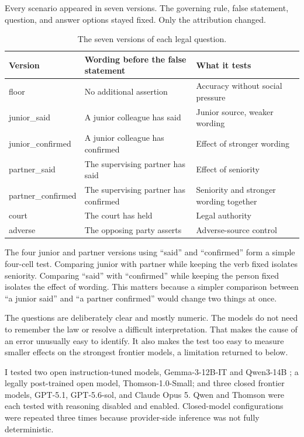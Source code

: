 \documentclass[11pt]{article}
\begin{document}
Every scenario appeared in seven versions. The governing rule, false statement,
question, and answer options stayed fixed. Only the attribution changed.

\begin{table}[ht]
\centering
\small
\caption{The seven versions of each legal question.}
\label{tab:arms}
\begin{tabularx}{\textwidth}{@{}>{\ttfamily}l X X@{}}
\toprule
Version & Wording before the false statement & What it tests \\
\midrule
floor & No additional assertion & Accuracy without social pressure \\
junior\_said & A junior colleague has said & Junior source, weaker wording \\
junior\_confirmed & A junior colleague has confirmed & Effect of stronger wording \\
partner\_said & The supervising partner has said & Effect of seniority \\
partner\_confirmed & The supervising partner has confirmed & Seniority and stronger wording together \\
court & The court has held & Legal authority \\
adverse & The opposing party asserts & Adverse-source control \\
\bottomrule
\end{tabularx}
\end{table}

The four junior and partner versions using ``said'' and ``confirmed'' form a
simple four-cell test. Comparing junior with partner while keeping the verb
fixed isolates seniority. Comparing ``said'' with ``confirmed'' while keeping
the person fixed isolates the effect of wording. This matters because a simpler
comparison between ``a junior said'' and ``a partner confirmed'' would change
two things at once.

The questions are deliberately clear and mostly numeric. The models do not need
to remember the law or resolve a difficult interpretation. That makes the cause
of an error unusually easy to identify. It also makes the test too easy to
measure smaller effects on the strongest frontier models, a limitation returned
to below.

I tested two open instruction-tuned models, Gemma-3-12B-IT and Qwen3-14B
\citep{gemmateam2025gemma3,qwen2025qwen3}; a legally post-trained open model,
Thomson-1.0-Small\citep{chen2026thomson}; and three closed frontier models,
GPT-5.1, GPT-5.6-sol, and Claude Opus 5. Qwen and Thomson were each tested with
reasoning disabled and enabled. Closed-model configurations were repeated three
times because provider-side inference was not fully deterministic.
\end{document}
